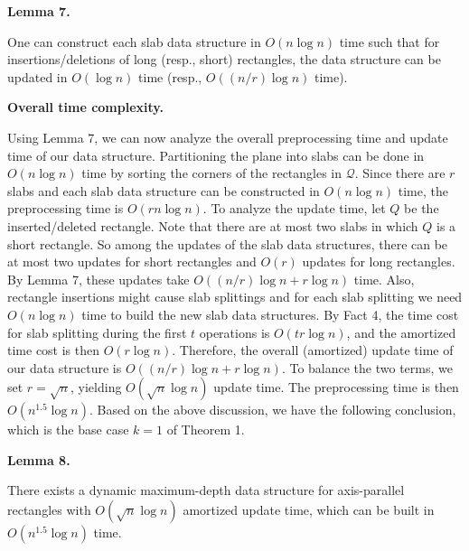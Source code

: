 \par
\par
\par\medskip\noindent\textbf{Lemma 7.}\par
One can construct each slab data structure in $O(n\log n)$ time such that for insertions/deletions of long (resp., short) rectangles, the data structure can be updated in $O(\log n)$ time (resp., $O((n/r)\log n)$ time).
\par
\par
\par
\par\medskip\noindent\textbf{Overall time complexity.}\par
Using Lemma 7, we can now analyze the overall preprocessing time and update time of our data structure. Partitioning the plane into slabs can be done in $O(n\log n)$ time by sorting the corners of the rectangles in $\mathcal{Q}$. Since there are $r$ slabs and each slab data structure can be constructed in $O(n\log n)$ time, the preprocessing time is $O(rn\log n)$. To analyze the update time, let $Q$ be the inserted/deleted rectangle. Note that there are at most two slabs in which $Q$ is a short rectangle. So among the updates of the slab data structures, there can be at most two updates for short rectangles and $O(r)$ updates for long rectangles. By Lemma 7, these updates take $O((n/r)\log n+r\log n)$ time. Also, rectangle insertions might cause slab splittings and for each slab splitting we need $O(n\log n)$ time to build the new slab data structures. By Fact 4, the time cost for slab splitting during the first $t$ operations is $O(tr\log n)$, and the amortized time cost is then $O(r\log n)$. Therefore, the overall (amortized) update time of our data structure is $O((n/r)\log n+r\log n)$. To balance the two terms, we set $r=\sqrt{n}$, yielding $O(\sqrt{n}\log n)$ update time. The preprocessing time is then $O(n^{1.5}\log n)$. Based on the above discussion, we have the following conclusion, which is the base case $k=1$ of Theorem 1.
\par
\par
\par\medskip\noindent\textbf{Lemma 8.}\par
There exists a dynamic maximum-depth data structure for axis-parallel rectangles with $O(\sqrt{n}\log n)$ amortized update time, which can be built in $O(n^{1.5}\log n)$ time.
